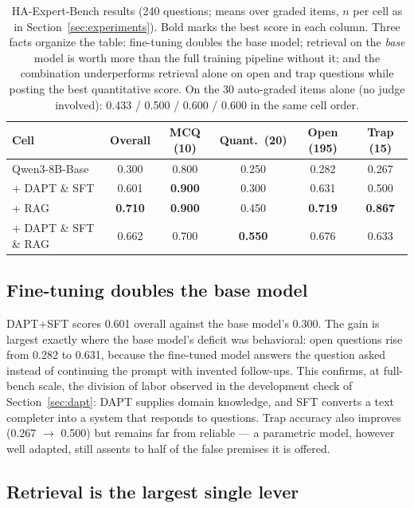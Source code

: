 \documentclass[11pt]{article}
\begin{document}
\begin{table}[t]
\centering
\begin{tabular}{lccccc}
\toprule
Cell & Overall & MCQ (10) & Quant.\ (20) & Open (195) & Trap (15) \\
\midrule
Qwen3-8B-Base        & 0.300 & 0.800 & 0.250 & 0.282 & 0.267 \\
+ DAPT \& SFT        & 0.601 & \textbf{0.900} & 0.300 & 0.631 & 0.500 \\
+ RAG                & \textbf{0.710} & \textbf{0.900} & 0.450 & \textbf{0.719} & \textbf{0.867} \\
+ DAPT \& SFT \& RAG & 0.662 & 0.700 & \textbf{0.550} & 0.676 & 0.633 \\
\bottomrule
\end{tabular}
\caption{HA-Expert-Bench results (240 questions; means over graded items,
$n$ per cell as in Section~\ref{sec:experiments}). Bold marks the best
score in each column. Three facts organize the table: fine-tuning doubles
the base model; retrieval on the \emph{base} model is worth more than the
full training pipeline without it; and the combination underperforms
retrieval alone on open and trap questions while posting the best
quantitative score. On the 30 auto-graded items alone (no judge involved):
0.433 / 0.500 / 0.600 / 0.600 in the same cell order.}
\label{tab:main}
\end{table}

\subsection{Fine-tuning doubles the base model}

DAPT+SFT scores 0.601 overall against the base model's 0.300. The gain is
largest exactly where the base model's deficit was behavioral: open
questions rise from 0.282 to 0.631, because the fine-tuned model answers
the question asked instead of continuing the prompt with invented
follow-ups. This confirms, at full-bench scale, the division of labor
observed in the development check of Section~\ref{sec:dapt}: DAPT
supplies domain knowledge, and SFT converts a text completer into a
system that responds to questions. Trap accuracy also improves
(0.267 $\rightarrow$ 0.500) but remains far from reliable --- a
parametric model, however well adapted, still assents to half of the
false premises it is offered.

\subsection{Retrieval is the largest single lever}
\end{document}

